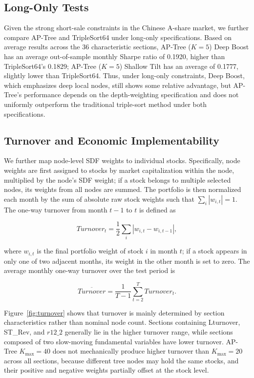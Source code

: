 \documentclass[12pt]{article}
\begin{document}
\subsection{Long-Only Tests}
\label{subsec:long_only}

Given the strong short-sale constraints in the Chinese A-share market, we further compare AP-Tree and TripleSort64 under long-only specifications. Based on average results across the 36 characteristic sections, AP-Tree (\(K=5\)) Deep Boost has an average out-of-sample monthly Sharpe ratio of 0.1920, higher than TripleSort64's 0.1829; AP-Tree (\(K=5\)) Shallow Tilt has an average of 0.1777, slightly lower than TripleSort64. Thus, under long-only constraints, Deep Boost, which emphasizes deep local nodes, still shows some relative advantage, but AP-Tree's performance depends on the depth-weighting specification and does not uniformly outperform the traditional triple-sort method under both specifications.

\subsection{Turnover and Economic Implementability}
\label{subsec:turnover}

We further map node-level SDF weights to individual stocks. Specifically, node weights are first assigned to stocks by market capitalization within the node, multiplied by the node's SDF weight; if a stock belongs to multiple selected nodes, its weights from all nodes are summed. The portfolio is then normalized each month by the sum of absolute raw stock weights such that \(\sum_i|w_{i,t}|=1\). The one-way turnover from month \(t-1\) to \(t\) is defined as

\begin{equation}
 Turnover_t=\frac{1}{2}\sum_i\left|w_{i,t}-w_{i,t-1}\right|,
 \label{eq:turnover_empirical}
\end{equation}

where \(w_{i,t}\) is the final portfolio weight of stock \(i\) in month \(t\); if a stock appears in only one of two adjacent months, its weight in the other month is set to zero. The average monthly one-way turnover over the test period is

\begin{equation}
 \overline{Turnover}
 =\frac{1}{T-1}\sum_{t=2}^{T}Turnover_t.
 \label{eq:average_turnover_empirical}
\end{equation}

Figure~\ref{fig:turnover} shows that turnover is mainly determined by section characteristics rather than nominal node count. Sections containing Lturnover, ST\_Rev, and \(r12\_2\) generally lie in the higher turnover range, while sections composed of two slow-moving fundamental variables have lower turnover. AP-Tree \(K_{\max}=40\) does not mechanically produce higher turnover than \(K_{\max}=20\) across all sections, because different tree nodes may hold the same stocks, and their positive and negative weights partially offset at the stock level.
\end{document}
